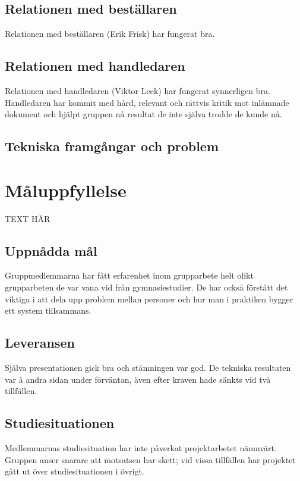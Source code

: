 \documentclass[10pt,oneside,swedish]{lips}
\begin{document}
\subsection{Relationen med beställaren}

Relationen med beställaren (Erik Frisk) har fungerat bra.

\subsection{Relationen med handledaren}

Relationen med handledaren (Viktor Leek) har fungerat synnerligen bra.
Handledaren har kommit med hård, relevant och rättvis kritik mot inlämnade
dokument och hjälpt gruppen nå resultat de inte själva trodde de kunde nå.

\subsection{Tekniska framgångar och problem}

\section{Måluppfyllelse}

TEXT HÄR

\subsection{Uppnådda mål}

Gruppmedlemmarna har fått erfarenhet inom grupparbete helt olikt grupparbeten de
var vana vid från gymnasiestudier. De har också förstått det viktiga i att dela
upp problem mellan personer och hur man i praktiken bygger ett system
tillsammans.

\subsection{Leveransen}

Själva presentationen gick bra och stämningen var god. De tekniska resultaten
var å andra sidan under förväntan, även efter kraven hade sänkts vid två
tillfällen.

\subsection{Studiesituationen}

Medlemmarnas studiesituation har inte påverkat projektarbetet nämnvärt. Gruppen
anser snarare att motsatsen har skett; vid vissa tillfällen har projektet gått
ut över studiesituationen i övrigt.
\end{document}

